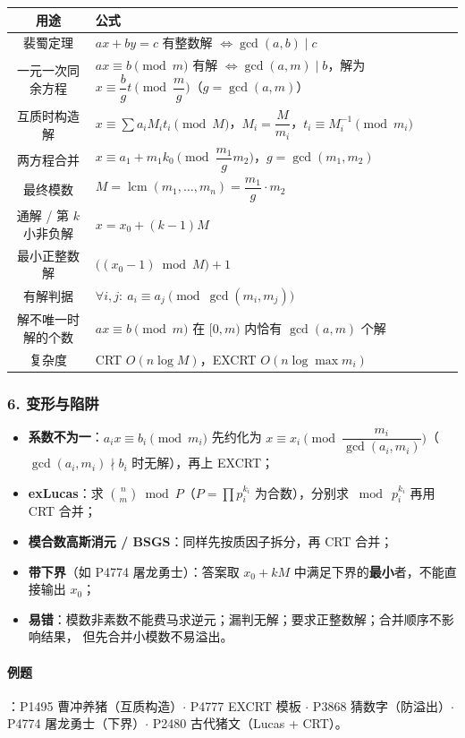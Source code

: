 \begin{center}
\begin{tabular}{|c|p{10.2cm}|}
\hline
\textbf{用途} & \textbf{公式} \\
\hline
裴蜀定理 & $ax + by = c$ 有整数解 $\iff \gcd(a,b) \mid c$ \\
\hline
一元一次同余方程 & $ax \equiv b \pmod m$ 有解 $\iff \gcd(a,m) \mid b$，解为 $x \equiv \dfrac{b}{g} t \pmod{\dfrac{m}{g}}$（$g=\gcd(a,m)$）\\
\hline
互质时构造解 & $x \equiv \sum a_i M_i t_i \pmod M$，$M_i = \dfrac{M}{m_i}$，$t_i \equiv M_i^{-1} \pmod{m_i}$ \\
\hline
两方程合并 & $x \equiv a_1 + m_1 k_0 \pmod{\dfrac{m_1}{g} m_2}$，$g = \gcd(m_1, m_2)$ \\
\hline
最终模数 & $M = \operatorname{lcm}(m_1, \dots, m_n) = \dfrac{m_1}{g} \cdot m_2$ \\
\hline
通解 / 第 $k$ 小非负解 & $x = x_0 + (k-1)M$ \\
\hline
最小正整数解 & $\big((x_0 - 1) \bmod M\big) + 1$ \\
\hline
有解判据 & $\forall i,j:\ a_i \equiv a_j \pmod{\gcd(m_i, m_j)}$ \\
\hline
解不唯一时解的个数 & $ax \equiv b \pmod m$ 在 $[0, m)$ 内恰有 $\gcd(a,m)$ 个解 \\
\hline
复杂度 & CRT $O(n \log M)$，EXCRT $O(n \log \max m_i)$ \\
\hline
\end{tabular}
\end{center}

\hrulefill

\subsubsection*{6. 变形与陷阱}

\begin{itemize}
    \item \textbf{系数不为一}：$a_i x \equiv b_i \pmod{m_i}$ 先约化为
    $x \equiv x_i \pmod{\dfrac{m_i}{\gcd(a_i, m_i)}}$（$\gcd(a_i,m_i) \nmid b_i$ 时无解），再上 EXCRT；
    \item \textbf{exLucas}：求 $\binom{n}{m} \bmod P$（$P = \prod p_i^{k_i}$ 为合数），分别求 $\bmod\ p_i^{k_i}$ 再用 CRT 合并；
    \item \textbf{模合数高斯消元 / BSGS}：同样先按质因子拆分，再 CRT 合并；
    \item \textbf{带下界}（如 P4774 屠龙勇士）：答案取 $x_0 + kM$ 中满足下界的\textbf{最小}者，不能直接输出 $x_0$；
    \item \textbf{易错}：模数非素数不能费马求逆元；漏判无解；要求正整数解；合并顺序不影响结果，
    但先合并小模数不易溢出。
\end{itemize}

\paragraph{例题}：P1495 曹冲养猪（互质构造）$\cdot$ P4777 EXCRT 模板 $\cdot$ P3868 猜数字（防溢出）$\cdot$
P4774 屠龙勇士（下界）$\cdot$ P2480 古代猪文（Lucas + CRT）。
